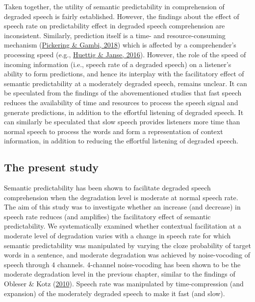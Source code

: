 \documentclass[a4paper, nobind]{templates/ociamthesis}
\begin{document}
Taken together, the utility of semantic predictability in comprehension of degraded speech is fairly established.
However, the findings about the effect of speech rate on predictability effect in degraded speech comprehension are inconsistent.
Similarly, prediction itself is a time- and resource-consuming mechanism (\protect\hyperlink{ref-Pickering2018}{Pickering \& Gambi, 2018}) which is affected by a comprehender's processing speed (e.g., \protect\hyperlink{ref-Huettig2016a}{Huettig \& Janse, 2016}).
However, the role of the speed of incoming information (i.e., speech rate of a degraded speech) on a listener's ability to form predictions, and hence its interplay with the facilitatory effect of semantic predictability at a moderately degraded speech, remains unclear.
It can be speculated from the findings of the abovementioned studies that fast speech reduces the availability of time and resources to process the speech signal and generate predictions, in addition to the effortful listening of degraded speech.
It can similarly be speculated that slow speech provides listeners more time than normal speech to process the words and form a representation of context information, in addition to reducing the effortful listening of degraded speech.

\hypertarget{the-present-study-1}{%
\subsection{The present study}\label{the-present-study-1}}

Semantic predictability has been shown to facilitate degraded speech comprehension when the degradation level is moderate at normal speech rate.
The aim of this study was to investigate whether an increase (and decrease) in speech rate reduces (and amplifies) the facilitatory effect of semantic predictability.
We systematically examined whether contextual facilitation at a moderate level of degradation varies with a change in speech rate for which
semantic predictability was manipulated by varying the cloze probability of target words in a sentence, and moderate degradation was achieved by noise-vocoding of speech through 4 channels.
4-channel noise-vocoding has been shown to be the moderate degradation level in the previous chapter, similar to the findings of Obleser \& Kotz (\protect\hyperlink{ref-Obleser2010}{2010}).
Speech rate was manipulated by time-compression (and expansion) of the moderately degraded speech to make it fast (and slow).
\end{document}
